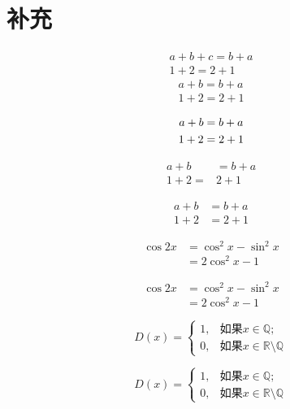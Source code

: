 \section{补充}
\begin{gather}
    a + b +c = b + a \\
    1+2 = 2 + 1
\end{gather}
\begin{gather*}
    a + b = b + a \\
    1+2 = 2 + 1
\end{gather*}

\begin{gather}
a + b = b + a \notag \\
1+2 = 2 + 1 \notag
\end{gather}

\begin{align}
    a+b &= b+a \\
    1+2= & 2+1
\end{align}

\begin{align*}
a+b &= b+a \\
1+2 &=2+1
\end{align*}

\begin{equation}
    \begin{split}
    \cos 2x &= \cos^2 x - \sin^2x \\
    &=2\cos^2x-1
    \end{split} 
\end{equation}

\begin{equation*}
\begin{split}
\cos 2x &= \cos^2 x - \sin^2x \\
&=2\cos^2x-1
\end{split} 
\end{equation*}

\begin{equation}
    D(x)=\begin{cases}
    1, & \text{如果} x \in \mathbb{Q};\\
    0, & \text{如果} x \in \mathbb{R}\setminus\mathbb{Q}
    \end{cases}
\end{equation}

\begin{equation*}
D(x)=\begin{cases}
1, & \text{如果} x \in \mathbb{Q};\\
0, & \text{如果} x \in \mathbb{R}\setminus\mathbb{Q}
\end{cases}
\end{equation*}

